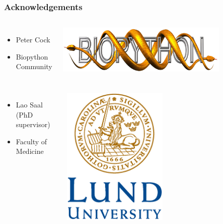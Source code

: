 \documentclass[trans]{beamer}
\begin{document}
\frame
{
  \frametitle{Acknowledgements}

  \begin{minipage}{1\textwidth}
  \begin{columns}
  \begin{itemize}
  \item Peter Cock
  \item Biopython Community
  \end{itemize}
  \includegraphics[width=0.8\textwidth]{../abstract/biopython.jpg}
  \end{columns}
  \end{minipage}

  \vspace{0.5cm}

  \begin{minipage}{1\textwidth}
  \begin{columns}
  \begin{itemize}
  \item Lao Saal (PhD supervisor)
  \item Faculty of Medicine
  \end{itemize}
  \includegraphics[width=0.5\textwidth]{LundUniversity_C2line_PMS.eps}
  \end{columns}
  \end{minipage}
  
}
\end{document}

